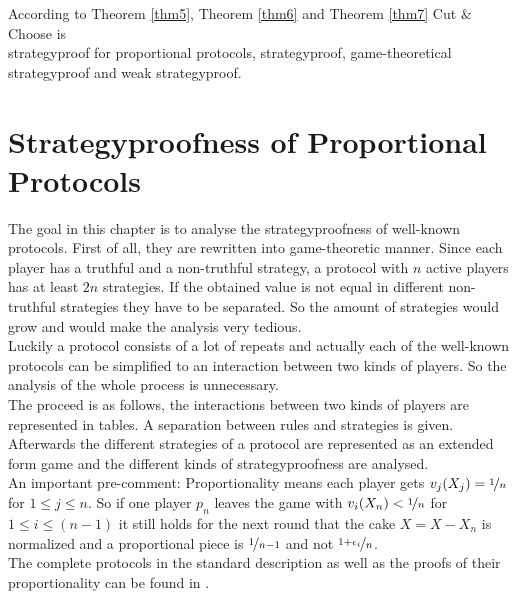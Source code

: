 \begin{bezeichnungen}
According to Theorem \ref{thm5}, Theorem \ref{thm6} and Theorem \ref{thm7} Cut $\&$ Choose is\\strategyproof for proportional protocols, strategyproof, game-theoretical strategyproof and weak strategyproof.
\end{bezeichnungen}
\pagebreak
\section{Strategyproofness of Proportional Protocols}
The goal in this chapter is to analyse the strategyproofness of well-known protocols. First of all, they are rewritten into game-theoretic manner. Since each player has a truthful and a non-truthful strategy, a protocol with $n$ active players has at least $2n$ strategies. If the obtained value is not equal in different non-truthful strategies they have to be separated. So the amount of strategies would grow and would make the analysis very tedious.\\Luckily a protocol consists of a lot of repeats and actually each of the well-known protocols can be simplified to an interaction between two kinds of players. So the analysis of the whole process is unnecessary.\\
The proceed is as follows, the interactions between two kinds of players are represented in tables. A separation between rules and strategies is given. Afterwards the different strategies of a protocol are represented as an extended form game and the different kinds of strategyproofness are analysed.\\
An important pre-comment: Proportionality means each player gets $v_j(X_j)=\nicefrac{1}{n}$ for $1\leq j\leq n$. So if one player $p_n$ leaves the game with $v_i(X_n)<\nicefrac{1}{n}$ for $1\leq i\leq (n-1)$ it still holds for the next round that the cake $X=X-X_n$ is normalized and a proportional piece is $\nicefrac{1}{n-1}$ and not $\nicefrac{1+\epsilon_i}{n}$.
\\The complete protocols in the standard description as well as the proofs of their proportionality can be found in \cite{robertson:cake-cutting}.
